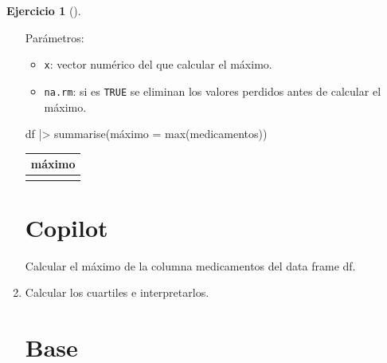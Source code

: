 \documentclass[
  a4paper,
]{scrreport}
\newenvironment{Shaded}{\begin{snugshade}}{\end{snugshade}}
\newcommand{\ExtensionTok}[1]{\textcolor[rgb]{0.00,0.23,0.31}{#1}}
\newcommand{\FunctionTok}[1]{\textcolor[rgb]{0.28,0.35,0.67}{#1}}
\newcommand{\NormalTok}[1]{\textcolor[rgb]{0.00,0.23,0.31}{#1}}
\newcommand{\OtherTok}[1]{\textcolor[rgb]{0.00,0.23,0.31}{#1}}
\newcommand{\SpecialCharTok}[1]{\textcolor[rgb]{0.37,0.37,0.37}{#1}}
\providecommand{\tightlist}{%
  \setlength{\itemsep}{0pt}\setlength{\parskip}{0pt}}\usepackage{longtable,booktabs,array}
\theoremstyle{definition}
\newtheorem{exercise}{Ejercicio}[chapter]
\theoremstyle{remark}
\begin{document}
\begin{exercise}[]
\begin{enumerate}
\begin{tcolorbox}
  Parámetros:

  \begin{itemize}
  \tightlist
  \item
    \texttt{x}: vector numérico del que calcular el máximo.
  \item
    \texttt{na.rm}: si es \texttt{TRUE} se eliminan los valores perdidos
    antes de calcular el máximo.
  \end{itemize}

\begin{Shaded}
\begin{Highlighting}[]
\NormalTok{df }\SpecialCharTok{|\textgreater{}} \FunctionTok{summarise}\NormalTok{(máximo }\OtherTok{=} \FunctionTok{max}\NormalTok{(medicamentos))}
\end{Highlighting}
\end{Shaded}

  \begin{longtable}[]{@{}r@{}}
  \toprule\noalign{}
  máximo \\
  \midrule\noalign{}
  \endhead
  \bottomrule\noalign{}
  \endlastfoot
  5 \\
  \end{longtable}

  \section{Copilot}

\begin{Shaded}
\begin{Highlighting}[]
\ExtensionTok{Calcular}\NormalTok{ el máximo de la columna medicamentos del data frame df.}
\end{Highlighting}
\end{Shaded}

  \end{tcolorbox}
\item
  Calcular los cuartiles e interpretarlos.

  \begin{tcolorbox}[enhanced jigsaw, colframe=quarto-callout-tip-color-frame, toprule=.15mm, bottomtitle=1mm, breakable, opacitybacktitle=0.6, toptitle=1mm, colback=white, bottomrule=.15mm, title=\textcolor{quarto-callout-tip-color}{\faLightbulb}\hspace{0.5em}{Solución}, arc=.35mm, left=2mm, titlerule=0mm, rightrule=.15mm, coltitle=black, leftrule=.75mm, opacityback=0, colbacktitle=quarto-callout-tip-color!10!white]

  \section{Base}


\end{tcolorbox}
\end{enumerate}
\end{exercise}
\end{document}
